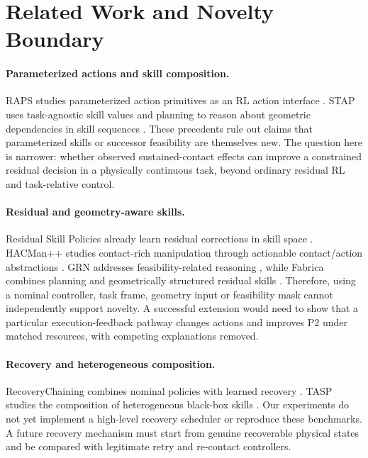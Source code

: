 \section{Related Work and Novelty Boundary}
\paragraph{Parameterized actions and skill composition.}
RAPS studies parameterized action primitives as an RL action interface \cite{dalal2021raps}. STAP uses task-agnostic skill values and planning to reason about geometric dependencies in skill sequences \cite{agia2023stap}. These precedents rule out claims that parameterized skills or successor feasibility are themselves new. The question here is narrower: whether observed sustained-contact effects can improve a constrained residual decision in a physically continuous task, beyond ordinary residual RL and task-relative control.

\paragraph{Residual and geometry-aware skills.}
Residual Skill Policies already learn residual corrections in skill space \cite{rana2023reskill}. HACMan++ studies contact-rich manipulation through actionable contact/action abstractions \cite{jiang2024hacmanpp}. GRN addresses feasibility-related reasoning \cite{bouhsain2025grn}, while Fabrica combines planning and geometrically structured residual skills \cite{tian2025fabrica}. Therefore, using a nominal controller, task frame, geometry input or feasibility mask cannot independently support novelty. A successful extension would need to show that a particular execution-feedback pathway changes actions and improves P2 under matched resources, with competing explanations removed.

\paragraph{Recovery and heterogeneous composition.}
RecoveryChaining combines nominal policies with learned recovery \cite{vats2025recovery}. TASP studies the composition of heterogeneous black-box skills \cite{hedegaard2026tasp}. Our experiments do not yet implement a high-level recovery scheduler or reproduce these benchmarks. A future recovery mechanism must start from genuine recoverable physical states and be compared with legitimate retry and re-contact controllers.

